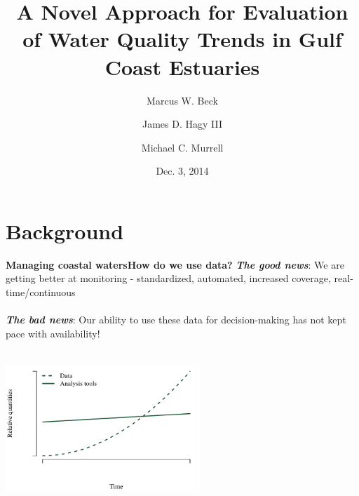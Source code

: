 \documentclass[serif]{beamer}\usepackage[]{graphicx}\usepackage[]{color}
\newcommand{\emtxt}[1]{\textbf{\textit{#1}}}
\begin{document}
\title[Trend Evaluation in Gulf Estuaries]{\textbf{A Novel Approach for Evaluation of Water Quality Trends in Gulf Coast Estuaries}}
\author[Beck, Hagy, Murrell]{Marcus W. Beck \and James D. Hagy III \and Michael C. Murrell}


\date{Dec. 3, 2014}


\begin{frame}[shrink]
\titlepage
\end{frame}

\section{Background}

\begin{frame}{\textbf{Managing coastal waters}}{\textbf{How do we use data?}}
\emtxt{The good news}: We are getting better at monitoring - standardized, automated, increased coverage, real-time/continuous \\~\\
\emtxt{The bad news}: Our ability to use these data for decision-making has not kept pace with availability! \\~\\


{\centering \includegraphics[width=0.55\textwidth]{fig/theo} 

}



\end{frame}
\end{document}
